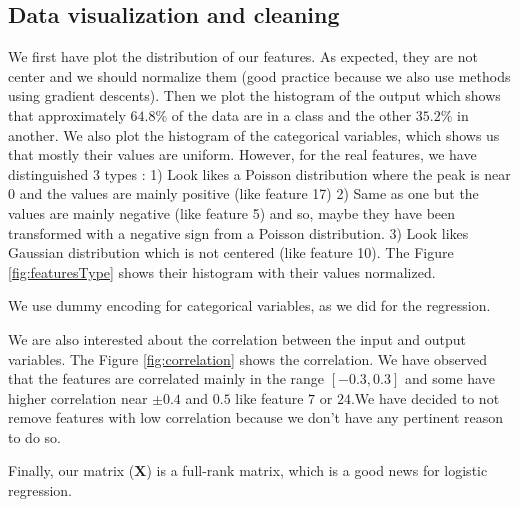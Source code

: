\documentclass{article} %
\begin{document}
\subsection{Data visualization and cleaning}

We first have plot the distribution of our features. As expected, they are not center and we should normalize them (good practice because we also use methods using gradient descents). Then we plot the histogram of the output which shows that approximately $64.8\%$ of the data are in a class and the other $35.2\%$ in another. We also plot the histogram of the categorical variables, which shows us that mostly their values are uniform. However, for the real features, we have distinguished 3 types : 1) Look likes a Poisson distribution where the peak is near 0 and the values are mainly positive (like feature 17) 2) Same as one but the values are mainly negative (like feature 5) and so, maybe they have been transformed with a negative sign from a Poisson distribution. 3) Look likes Gaussian distribution which is not centered (like feature 10). The Figure \ref{fig:featuresType} shows their histogram with their values normalized.

We use dummy encoding for categorical variables, as we did for the regression.

We are also interested about the correlation between the input and output variables. The Figure \ref{fig:correlation} shows the correlation. We have observed that the features are correlated mainly in the range $[-0.3,0.3]$ and some have higher correlation near $\pm0.4$ and $0.5$ like feature $7$ or $24$.We have decided to not remove features with low correlation because we don't have any pertinent reason to do so.

Finally, our matrix ($\mathbf{X}$) is a full-rank matrix, which is a good news for logistic regression.
\end{document}
